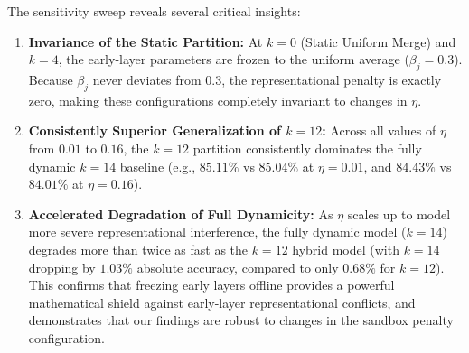 The sensitivity sweep reveals several critical insights:
\begin{enumerate}
    \item \textbf{Invariance of the Static Partition:} At $k=0$ (Static Uniform Merge) and $k=4$, the early-layer parameters are frozen to the uniform average ($\beta_j = 0.3$). Because $\beta_j$ never deviates from $0.3$, the representational penalty is exactly zero, making these configurations completely invariant to changes in $\eta$.
    \item \textbf{Consistently Superior Generalization of $k=12$:} Across all values of $\eta$ from $0.01$ to $0.16$, the $k=12$ partition consistently dominates the fully dynamic $k=14$ baseline (e.g., $85.11\%$ vs $85.04\%$ at $\eta=0.01$, and $84.43\%$ vs $84.01\%$ at $\eta=0.16$).
    \item \textbf{Accelerated Degradation of Full Dynamicity:} As $\eta$ scales up to model more severe representational interference, the fully dynamic model ($k=14$) degrades more than twice as fast as the $k=12$ hybrid model (with $k=14$ dropping by $1.03\%$ absolute accuracy, compared to only $0.68\%$ for $k=12$). This confirms that freezing early layers offline provides a powerful mathematical shield against early-layer representational conflicts, and demonstrates that our findings are robust to changes in the sandbox penalty configuration.
\end{enumerate}

